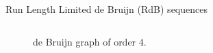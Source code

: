 \begin{frame}{Run Length Limited de Bruijn (RdB) sequences}
\begin{overprint}
\begin{columns}
{\begin{column}{0.33\textwidth}
\begin{figure}[htbp]
                        \caption{de Bruijn graph of order $4$.}
                    \end{figure}
                \end{column}
            }
\end{columns}
\end{overprint}
\end{frame}
